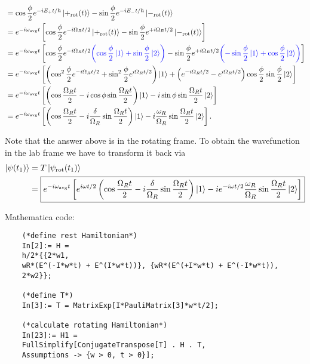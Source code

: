 \documentclass{article}
\theoremstyle{definition}
\newcommand{\f}[2]{\frac{#1}{#2}}
\newcommand{\lp}{\left(}
\newcommand{\rp}{\right)}
\newcommand{\lb}{\left[}
\newcommand{\rb}{\right]}
\begin{document}
\begin{enumerate}[label=\alph*)]
\begin{align*}
	&= \cos\f{\phi}{2}e^{-i E_+ t/\hbar} \ket{+_\text{rot}(t)} -\sin\f{\phi}{2}e^{-i E_- t/\hbar}\ket{-_\text{rot}(t)}\\
	&= e^{-i\omega_\text{avg} t}\lb \cos\f{\phi}{2} e^{-i\Omega_R t/2} \ket{+_\text{rot}(t)} - \sin\f{\phi}{2}e^{+i\Omega_R t/2} \ket{-_\text{rot}(t)} \rb\\
	&= e^{-i\omega_\text{avg} t}\lb \cos\f{\phi}{2} e^{-i\Omega_R t/2} \textcolor{blue}{\lp \cos \f{\phi}{2} \ket{1} + \sin\f{\phi}{2}\ket{2} \rp}- \sin\f{\phi}{2}e^{+i\Omega_R t/2} \textcolor{blue}{\lp -\sin \f{\phi}{2} \ket{1} + \cos\f{\phi}{2}\ket{2}  \rp } \rb \\
	&= e^{-i\omega_\text{avg} t}\lb \lp \cos^2\f{\phi}{2} e^{-i\Omega_R t/2}+\sin^2\f{\phi}{2} e^{i\Omega_R t/2}  \rp \ket{1} + \lp e^{-i\Omega_R t/2} - e^{i\Omega_R t/2}  \rp \cos\f{\phi}{2}\sin\f{\phi}{2}\ket{2} \rb \\
	&= e^{-i\omega_\text{avg} t}\lb \lp \cos\f{\Omega_R t}{2} - i\cos \phi \sin\f{\Omega_R t}{2} \rp \ket{1} - i\sin\phi \sin\f{\Omega_R t}{2} \ket{2} \rb \\
	&= e^{-i\omega_\text{avg}t }\lb \lp \cos\f{\Omega_R t}{2} - i\f{\delta}{\Omega_R} \sin\f{\Omega_R t}{2}   \rp \ket{1} - i\f{\omega_R}{\Omega_R} \sin\f{\Omega_R t}{2} \ket{2}\rb.
 	\end{align*}
	
	Note that the answer above is in the rotating frame. To obtain the wavefunction in the lab frame we have to transform it back via
	\begin{align*}
	\ket{\psi(t_1)} &= T \ket{\psi_\text{rot}(t_1)}\\
	&= \boxed{e^{-i\omega_\text{avg}t }\lb e^{i\omega t/2} \lp \cos\f{\Omega_R t}{2} - i\f{\delta}{\Omega_R} \sin\f{\Omega_R t}{2}   \rp \ket{1} - i e^{-i\omega t/2}\f{\omega_R}{\Omega_R} \sin\f{\Omega_R t}{2} \ket{2}\rb}
	\end{align*}
	
	
	
	
	
	
	
	
	
	
	
	
	
	Mathematica code:
	\begin{lstlisting}
	(*define rest Hamiltonian*)
	In[2]:= H = 
	h/2*{{2*w1, 
	wR*(E^(-I*w*t) + E^(I*w*t))}, {wR*(E^(+I*w*t) + E^(-I*w*t)), 
	2*w2}};
	
	(*define T*)
	In[3]:= T = MatrixExp[I*PauliMatrix[3]*w*t/2];
	
	(*calculate rotating Hamiltonian*)
	In[23]:= H1 = 
	FullSimplify[ConjugateTranspose[T] . H . T, 
	Assumptions -> {w > 0, t > 0}];
	

\end{lstlisting}
\end{enumerate}
\end{document}
